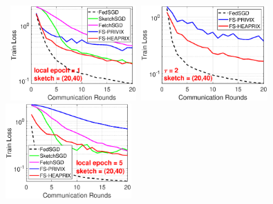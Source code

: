 \documentclass{article} %
\begin{document}
\begin{figure}[h]
	\begin{center}
		\mbox{%
		 \includegraphics[width=1.9in]{MNIST_figures/local1_sketch20_iid1_train_loss.eps} 
		\includegraphics[width=1.9in]{MNIST_figures/local2_sketch20_iid1_train_loss.eps} 
		\includegraphics[width=1.9in]{MNIST_figures/local5_sketch20_iid1_train_loss.eps}}
		

\end{center}
\end{figure}
\end{document}
